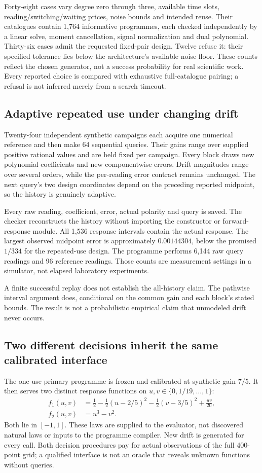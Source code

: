 \documentclass[11pt,letterpaper]{article}
\theoremstyle{definition}\newtheorem{definition}[theorem]{Definition}
\theoremstyle{remark}\newtheorem{remark}[theorem]{Remark}
\begin{document}
Forty-eight cases vary degree zero through three, available time slots, reading/switching/waiting prices, noise bounds and intended reuse. Their catalogues contain 1,764 informative programmes, each checked independently by a linear solve, moment cancellation, signal normalization and dual polynomial. Thirty-six cases admit the requested fixed-pair design. Twelve refuse it: their specified tolerance lies below the architecture's available noise floor. These counts reflect the chosen generator, not a success probability for real scientific work. Every reported choice is compared with exhaustive full-catalogue pairing; a refusal is not inferred merely from a search timeout.

\subsection{Adaptive repeated use under changing drift}
Twenty-four independent synthetic campaigns each acquire one numerical reference and then make 64 sequential queries. Their gains range over supplied positive rational values and are held fixed per campaign. Every block draws new polynomial coefficients and new componentwise errors. Drift magnitudes range over several orders, while the per-reading error contract remains unchanged. The next query's two design coordinates depend on the preceding reported midpoint, so the history is genuinely adaptive.

Every raw reading, coefficient, error, actual polarity and query is saved. The checker reconstructs the history without importing the constructor or forward-response module. All 1,536 response intervals contain the actual response. The largest observed midpoint error is approximately $0.00144304$, below the promised $1/334$ for the repeated-use design. The programme performs 6,144 raw query readings and 96 reference readings. Those counts are measurement settings in a simulator, not elapsed laboratory experiments.

A finite successful replay does not establish the all-history claim. The pathwise interval argument does, conditional on the common gain and each block's stated bounds. The result is not a probabilistic empirical claim that unmodeled drift never occurs.

\subsection{Two different decisions inherit the same calibrated interface}
The one-use primary programme is frozen and calibrated at synthetic gain $7/5$. It then serves two distinct response functions on $u,v\in\{0,1/19,\ldots,1\}$:
\begin{align}
 f_1(u,v)&=\frac12-\frac12(u-2/5)^2-\frac12(v-3/5)^2+\frac{uv}{20},\\
 f_2(u,v)&=u^3-v^2.
 \label{eq:functions}
\end{align}
Both lie in $[-1,1]$. These laws are supplied to the evaluator, not discovered natural laws or inputs to the programme compiler. New drift is generated for every call. Both decision procedures pay for actual observations of the full 400-point grid; a qualified interface is not an oracle that reveals unknown functions without queries.
\end{document}
